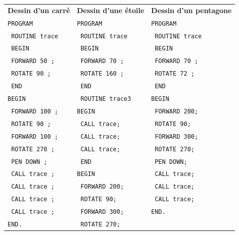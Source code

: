 \begin{table}[t]
  \centering
  \small
  \begin{tabular}{l|l|l}
  \textbf{Dessin d'un carré}    &  \textbf{Dessin d'une étoile}  &  \textbf{Dessin d'un pentagone} \\
  \texttt{PROGRAM}              &  \texttt{PROGRAM}              &  \texttt{PROGRAM}               \\
  \texttt{  ROUTINE trace}      &  \texttt{  ROUTINE trace}      &  \texttt{  ROUTINE trace}       \\
  \texttt{  BEGIN}              &  \texttt{  BEGIN}              &  \texttt{  BEGIN}               \\
  \texttt{    FORWARD 50 ;}     &  \texttt{    FORWARD 70 ;}     &  \texttt{    FORWARD 70 ;}      \\
  \texttt{    ROTATE 90 ;}      &  \texttt{    ROTATE 160 ;}     &  \texttt{    ROTATE 72 ;}       \\
  \texttt{  END}                &  \texttt{  END}                &  \texttt{  END}                 \\
  \texttt{BEGIN}                &  \texttt{  ROUTINE trace3}     &  \texttt{BEGIN}                 \\
  \texttt{  FORWARD 100 ;}      &  \texttt{BEGIN}                &  \texttt{  FORWARD 200;}        \\
  \texttt{  ROTATE 90 ;}        &  \texttt{  CALL trace;}        &  \texttt{  ROTATE 90;}          \\
  \texttt{  FORWARD 100 ;}      &  \texttt{  CALL trace;}        &  \texttt{  FORWARD 300;}        \\
  \texttt{  ROTATE 270 ;}       &  \texttt{  CALL trace;}        &  \texttt{  ROTATE 270;}         \\
  \texttt{  PEN DOWN ;}         &  \texttt{  END}                &  \texttt{  PEN DOWN;}           \\
  \texttt{  CALL trace ;}       &  \texttt{BEGIN}                &  \texttt{  CALL trace;}         \\
  \texttt{  CALL trace ;}       &  \texttt{  FORWARD 200;}       &  \texttt{  CALL trace;}         \\
  \texttt{  CALL trace ;}       &  \texttt{  ROTATE 90;}         &  \texttt{  CALL trace;}         \\
  \texttt{  CALL trace ;}       &  \texttt{  FORWARD 300;}       &  \texttt{END.}\\
  \texttt{END.}                 &  \texttt{  ROTATE 270;}        & \\

\end{tabular}
\end{table}
